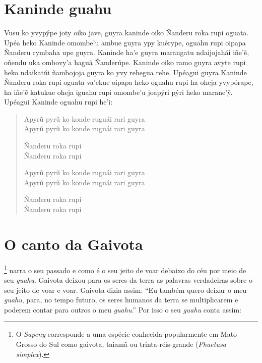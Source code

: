 \chapter{Kaninde guahu}

 Vusu ko yvypýpe joty oiko jave, guyra kaninde oiko Ñanderu roka
rupi oguata. Upéa heko Kaninde omombe'u ambue guyra ypy kuérype, oguahu
rupi oipapa Ñanderu rymbaha upe guyra. Kaninde ha'e guyra marangatu
ndaijojahái iñe'ẽ, oñendu uka ombovy'a haguã Ñanderúpe. Kaninde oiko
ramo guyra avyte rupi heko ndaikatúi ñambojoja guyra ko yvy rehegua
rehe. Upéagui guyra Kaninde Ñanderu roka rupi oguata va'ekue oipapa heko
oguahu rupi ha oheja yvypórape, ha iñe'ẽ katukue oheja iguahu rupi
omombe'u joapýri pýri heko marane'ỹ. Upéagui Kaninde oguahu rupi he'i:

\begin{verse}
Apyrũ pyrũ ko konde ruguái rari guyra\\
Apyrũ pyrũ ko konde ruguái rari guyra

Ñanderu roka rupi\\
Ñanderu roka rupi

Apyrũ pyrũ ko konde ruguái rari guyra\\
Apyrũ pyrũ ko konde ruguái rari guyra

Ñanderu roka rupi\\
Ñanderu roka rupi
\end{verse}

\chapter{O canto da Gaivota}

\footnote{O \textit{Sapeny} corresponde a uma espécie conhecida
  popularmente em Mato Grosso do Sul como gaivota, taiamã ou
  trinta-réis-grande (\textit{Phaetusa simplex}).} narra o seu passado e
como é o seu jeito de voar debaixo do céu por meio de seu \textit{guahu}.
Gaivota deixou para os seres da terra as palavras verdadeiras sobre o
seu jeito de voar e voar. Gaivota dizia assim: ``Eu também quero deixar
o meu \textit{guahu}, para, no tempo futuro, os seres humanos da terra se
multiplicarem e poderem contar para outros o meu \textit{guahu}.'' Por
isso o seu \textit{guahu} conta assim:

